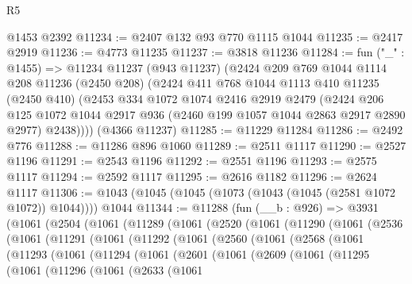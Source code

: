 \begin{lexlean}{R5}
\begin{coremodule}
    @1453
    @2392
@11234 := @2407 @132 @93 @770 @1115 @1044
@11235 := @2417 @2919
@11236 := @4773 @11235
@11237 := @3818 @11236
@11284 := fun ("_" : @1455) =>
  @11234
    @11237
    (@943 @11237)
    (@2424
      @209
      @769
      @1044
      @1114
      @208
      @11236
      (@2450 @208)
      (@2424
        @411
        @768
        @1044
        @1113
        @410
        @11235
        (@2450 @410)
        (@2453
          @334
          @1072
          @1074
          @2416
          @2919
          @2479
          (@2424
            @206
            @125
            @1072
            @1044
            @2917
            @936
            (@2460 @199 @1057 @1044 @2863 @2917 @2890 @2977)
            @2438))))
    (@4366 @11237)
@11285 := @11229 @11284
@11286 := @2492 @776
@11288 := @11286 @896 @1060
@11289 := @2511 @1117
@11290 := @2527 @1196
@11291 := @2543 @1196
@11292 := @2551 @1196
@11293 := @2575 @1117
@11294 := @2592 @1117
@11295 := @2616 @1182
@11296 := @2624 @1117
@11306 := @1043 (@1045 (@1045 (@1073 (@1043 (@1045 (@2581 @1072 @1072)) @1044)))) @1044
@11344 := @11288
    (fun (__b : @926) =>
    @3931
      (@1061
        (@2504
          (@1061
            (@11289
              (@1061
                (@2520
                  (@1061
                    (@11290
                      (@1061
                        (@2536
                          (@1061
                            (@11291
                              (@1061
                                (@11292
                                  (@1061
                                    (@2560
                                      (@1061
                                        (@2568
                                          (@1061
                                            (@11293
                                              (@1061
                                                (@11294
                                                  (@1061
                                                    (@2601
                                                      (@1061
                                                        (@2609
                                                          (@1061
                                                            (@11295
                                                              (@1061
                                                                (@11296
                                                                  (@1061
                                                                    (@2633
                                                                      (@1061

\end{coremodule}
\end{lexlean}
